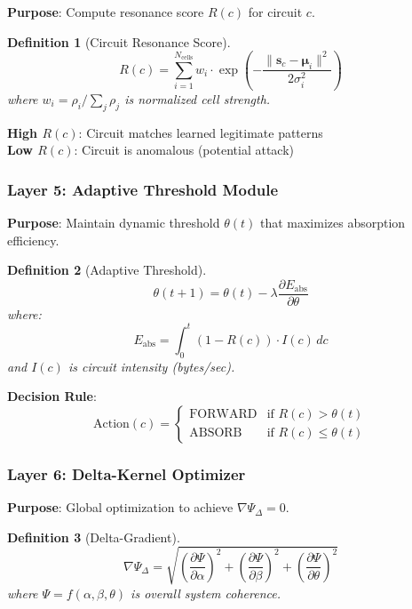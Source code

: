 \documentclass[11pt,a4paper]{article}
\newtheorem{definition}{Definition}[section]
\begin{document}
\textbf{Purpose}: Compute resonance score $R(c)$ for circuit $c$.

\begin{definition}[Circuit Resonance Score]
\begin{equation}
R(c) = \sum_{i=1}^{N_{\text{cells}}} w_i \cdot \exp\left( -\frac{\|\mathbf{s}_c - \boldsymbol{\mu}_i\|^2}{2\sigma_i^2} \right)
\end{equation}
where $w_i = \rho_i / \sum_j \rho_j$ is normalized cell strength.
\end{definition}

\textbf{High $R(c)$}: Circuit matches learned legitimate patterns \\
\textbf{Low $R(c)$}: Circuit is anomalous (potential attack)

\subsubsection{Layer 5: Adaptive Threshold Module}

\textbf{Purpose}: Maintain dynamic threshold $\theta(t)$ that maximizes absorption efficiency.

\begin{definition}[Adaptive Threshold]
\begin{equation}
\theta(t+1) = \theta(t) - \lambda \frac{\partial E_{\text{abs}}}{\partial \theta}
\end{equation}
where:
\begin{equation}
E_{\text{abs}} = \int_0^t (1 - R(c)) \cdot I(c) \, dc
\end{equation}
and $I(c)$ is circuit intensity (bytes/sec).
\end{definition}

\textbf{Decision Rule}:
\begin{equation}
\text{Action}(c) = \begin{cases}
\text{FORWARD} & \text{if } R(c) > \theta(t) \\
\text{ABSORB} & \text{if } R(c) \leq \theta(t)
\end{cases}
\end{equation}

\subsubsection{Layer 6: Delta-Kernel Optimizer}

\textbf{Purpose}: Global optimization to achieve $\nabla \Psi_\Delta = 0$.

\begin{definition}[Delta-Gradient]
\begin{equation}
\nabla \Psi_\Delta = \sqrt{ \left( \frac{\partial \Psi}{\partial \alpha} \right)^2 + \left( \frac{\partial \Psi}{\partial \beta} \right)^2 + \left( \frac{\partial \Psi}{\partial \theta} \right)^2 }
\end{equation}
where $\Psi = f(\alpha, \beta, \theta)$ is overall system coherence.
\end{definition}
\end{document}
